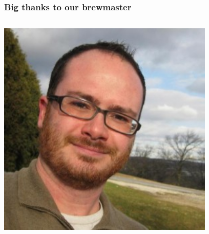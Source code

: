 \documentclass[xcolor=dvipsnames,red]{beamer}
\begin{document}
\begin{frame}
\frametitle{Big thanks to our brewmaster}
\begin{columns}
\begin{column}{.5\textwidth}
\includegraphics[width=1\textwidth]{imgs/miked.jpg}
\end{column}
\begin{column}{.5\textwidth}

\end{column}
\end{columns}
\end{frame}
\end{document}

